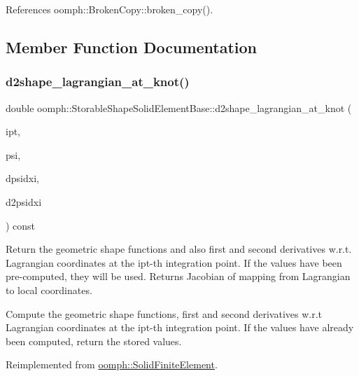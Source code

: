 References oomph\+::\+Broken\+Copy\+::broken\+\_\+copy().



\subsection{Member Function Documentation}
\mbox{\label{classoomph_1_1StorableShapeSolidElementBase_a55f3ab1f51572cf77e374e4917f47f2b}} 
\subsubsection{\texorpdfstring{d2shape\+\_\+lagrangian\+\_\+at\+\_\+knot()}{d2shape\_lagrangian\_at\_knot()}}
{\footnotesize\ttfamily double oomph\+::\+Storable\+Shape\+Solid\+Element\+Base\+::d2shape\+\_\+lagrangian\+\_\+at\+\_\+knot (\begin{DoxyParamCaption}\item[{const unsigned \&}]{ipt,  }\item[{\hyperlink{classoomph_1_1Shape}{Shape} \&}]{psi,  }\item[{\hyperlink{classoomph_1_1DShape}{D\+Shape} \&}]{dpsidxi,  }\item[{\hyperlink{classoomph_1_1DShape}{D\+Shape} \&}]{d2psidxi }\end{DoxyParamCaption}) const\hspace{0.3cm}{\ttfamily [virtual]}}



Return the geometric shape functions and also first and second derivatives w.\+r.\+t. Lagrangian coordinates at the ipt-\/th integration point. If the values have been pre-\/computed, they will be used. Returns Jacobian of mapping from Lagrangian to local coordinates. 

Compute the geometric shape functions, first and second derivatives w.\+r.\+t Lagrangian coordinates at the ipt-\/th integration point. If the values have already been computed, return the stored values. 

Reimplemented from \hyperlink{classoomph_1_1SolidFiniteElement_a69d17ec5fa308adae42e2f3171649bfe}{oomph\+::\+Solid\+Finite\+Element}.



